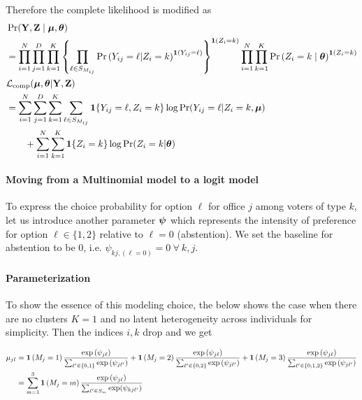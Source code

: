 \documentclass[11pt]{article}
\begin{document}
Therefore the complete likelihood is modified as 
\begin{align}
&\Pr(\mathbf{Y}, \mathbf{Z} \mid \bm{\mu}, \bm{\theta})\nonumber\\
&= \prod^{N}_{i=1}\prod^{D}_{j=1}\prod^{K}_{k=1}\left\{\prod^{}_{\ell\in S_{M_{ij}}}\mathbb{\Pr}\left(Y_{ij} = \ell | Z_i = k\right)^{\bm{1}\left(Y_{ij} = \ell\right)}\right\}^{\bm{1}\left(Z_i=k\right)} \prod^N_{i=1}\prod^K_{k=1}\mathbb{\Pr}\left(Z_i = {k} \mid \bm{\theta}\right)^{\bm{1}\left(Z_i = k\right)}\nonumber\\
&\mathcal{L}_{\text{comp}}(\bm{\mu}, \bm{\theta}|\mathbf{Y}, \mathbf{Z})\nonumber\\
& = \sum^{N}_{i=1}\sum^{D}_{j=1}\sum^{K}_{k=1}\sum^{}_{\ell \in S_{M_{ij}}}
\bm{1}\{Y_{ij} = \ell, Z_{i} = k\}
\log \Pr(Y_{ij} = \ell | Z_{i} = k, \bm{\mu})\nonumber\\
& \qquad +
\sum^N_{i=1}\sum^{K}_{k=1}\bm{1}\{Z_{i} = k\}\log \Pr(Z_{i} = k | \bm{\theta})
\end{align}



\paragraph{Moving from a Multinomial model to a logit model} To express the choice probability for option \(\ell\) for office \(j\) among voters of type \(k\), let us introduce another parameter \(\bm{\psi}\) which represents the intensity of preference for option \(\ell \in \{1, 2\}\) relative to \(\ell = 0\) (abstention). We set the baseline for abstention to be 0, i.e. \(\psi_{kj,(\ell=0)} = 0 ~\forall~ k, j\).  


\paragraph{Parameterization} To show the essence of this modeling choice, the below shows the case when there are no clusters \(K = 1\) and no latent heterogeneity across individuals for simplicity. Then the indices \(i, k\) drop and we get

\begin{align}
\mu_{j\ell} &= \bm{1}\left(M_{j}= 1\right)\frac{\exp{(\psi_{j\ell}})}{\sum_{\ell^\prime \in \{0, 1\}}\exp{(\psi_{j\ell^\prime})}} +\bm{1}\left(M_{j}= 2\right)\frac{\exp{(\psi_{j\ell})}}{\sum_{\ell^\prime \in \{0, 2\}}\exp{(\psi_{j\ell^\prime}})}\nonumber +\bm{1}\left(M_{j}= 3\right)\frac{\exp{(\psi_{j\ell}})}{\sum_{\ell^\prime \in \{0, 1, 2\}}\exp{(\psi_{j\ell^\prime}})}\nonumber\\
&= \sum_{m = 1}^{3}\bm{1}\left(M_{j}= m\right)\frac{\exp{(\psi_{j\ell})}}{\sum_{\ell^\prime \in S_m}\exp(\psi_{kj\ell^\prime})}\nonumber
\end{align}
\end{document}
